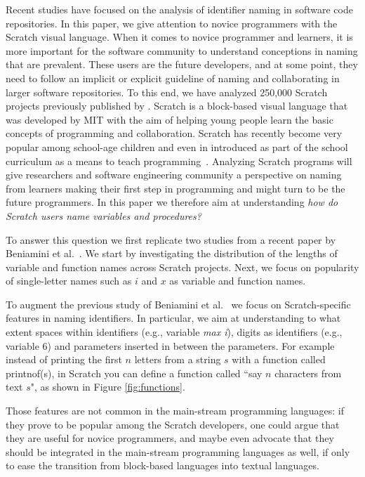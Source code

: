 \documentclass[conference]{IEEEtran}
\begin{document}
Recent studies have focused on the analysis of identifier naming in software code repositories. 
In this paper, we give attention to novice programmers with the Scratch visual language. 
When it comes to novice programmer and learners, it is more important for the software community to understand conceptions in naming that are prevalent. 
These users are the future developers, and at some point, they need to follow an implicit or explicit guideline of naming and collaborating in larger software repositories. 
To this end, we have analyzed 250,000 Scratch projects previously published by \cite{Aivaloglou2016HowKC}.
Scratch is a block-based visual language that was developed by MIT with the aim of helping young people learn the basic concepts of programming and collaboration.
Scratch has recently become very popular among school-age children and even in introduced as part of the school curriculum as a means to teach programming~\cite{SaezLopez}.
Analyzing Scratch programs will give researchers and software engineering community a perspective on naming from learners making their first step in programming and might turn to be the future programmers. In this paper we therefore aim at understanding \emph{how do Scratch users name variables and procedures? }

To answer this question we first replicate two studies from a recent paper by Beniamini et al.~\cite{Beniamini}.
We start by investigating the distribution of the lengths of variable and function names across Scratch projects. 
Next, we focus on popularity of single-letter names such as $i$ and $x$ as variable and function names.

To augment the previous study of Beniamini et al.~\cite{Beniamini} we focus on Scratch-specific features in naming identifiers.
In particular, we aim at understanding to what extent spaces within identifiers (e.g., variable \emph{max i}), digits as identifiers (e.g., variable 6) and parameters inserted in between the parameters. For example instead of printing the first $n$ letters from a string $s$ with a function called printnof(s), in Scratch you can define a function called ``say $n$ characters from text $s$", as shown in Figure \ref{fig:functions}.

Those features are not common in the main-stream programming languages: if they prove to be popular among the Scratch developers, one could argue that they are useful for novice programmers, and maybe even advocate that they should be integrated in the main-stream programming languages as well, if only to ease the transition from block-based languages into textual languages.
\end{document}
